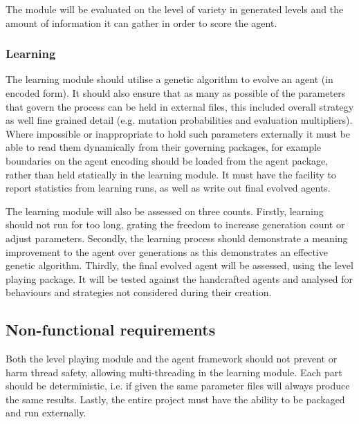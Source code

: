 The module will be evaluated on the level of variety in generated levels and the amount of information it can gather in order to score the agent.

\subsubsection{Learning}
The learning module should utilise a genetic algorithm to evolve an agent (in encoded form). It should also ensure that as many as possible of the parameters that govern the process can be held in external files, this included overall strategy as well fine grained detail (e.g. mutation probabilities and evaluation multipliers). Where impossible or inappropriate to hold such parameters externally it must be able to read them dynamically from their governing packages, for example boundaries on the agent encoding should be loaded from the agent package, rather than held statically in the learning module. It must have the facility to report statistics from learning runs, as well as write out final evolved agents.

The learning module will also be assessed on three counts. Firstly, learning should not run for too long, grating the freedom to increase generation count or adjust parameters. Secondly, the learning process should demonstrate a meaning improvement to the agent over generations as this demonstrates an effective genetic algorithm. Thirdly, the final evolved agent will be assessed, using the level playing package. It will be tested against the handcrafted agents and analysed for behaviours and strategies not considered during their creation. 



\subsection{Non-functional requirements}

Both the level playing module and the agent framework should not prevent or harm thread safety, allowing multi-threading in the learning module. Each part should be deterministic, i.e. if given the same parameter files will always produce the same results. Lastly, the entire project must have the ability to be packaged and run externally.



